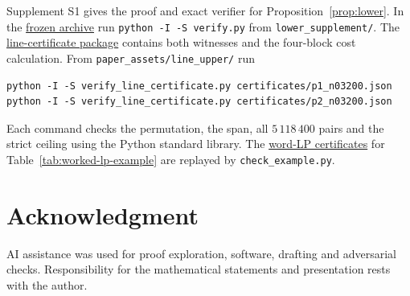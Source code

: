 \documentclass[review,hidelinks,onefignum,onetabnum]{siamart251216}
\begin{document}
Supplement S1 gives the proof and exact verifier for
Proposition~\ref{prop:lower}. In the
\href{https://github.com/falker47/ringmin/raw/paper-ii-sidma-r1/paper_assets/paper_ii_journal/source_bundle.zip}{frozen archive}
run \texttt{python -I -S verify.py} from \texttt{lower\_supplement/}.
The \href{https://github.com/falker47/ringmin/tree/paper-ii-sidma-r1/paper_assets/line_upper}{line-certificate package}
contains both witnesses and the four-block cost calculation. From
\texttt{paper\_assets/line\_upper/} run
{\small
\begin{verbatim}
python -I -S verify_line_certificate.py certificates/p1_n03200.json
python -I -S verify_line_certificate.py certificates/p2_n03200.json
\end{verbatim}
}
Each command checks the permutation, the span, all $5\,118\,400$ pairs and
the strict ceiling using the Python standard library.
The \href{https://github.com/falker47/ringmin/tree/paper-ii-sidma-r1/independent_check/p2_lp_example}{word-LP certificates}
for Table~\ref{tab:worked-lp-example} are replayed by \texttt{check\_example.py}.

\section*{Acknowledgment}
AI assistance was used for proof exploration, software, drafting and
adversarial checks. Responsibility for the mathematical statements and
presentation rests with the author.



\end{document}
